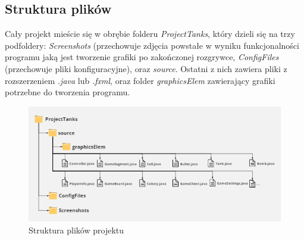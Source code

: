 \documentclass[11pt,a4paper]{report}
\begin{document}
\subsection {Struktura plików}
Cały projekt mieście się w obrębie folderu \textsl{ProjectTanks}, który dzieli się na trzy podfoldery: \textsl{Screenshots} (przechowuje zdjęcia powstałe w wyniku funkcjonalności programu jaką jest tworzenie grafiki po zakończonej rozgrywce, \textsl{ConfigFiles} (przechowuje pliki konfiguracyjne), oraz \textsl{source}. Ostatni z nich zawiera pliki z rozszerzeniem \textsl{.java} lub \textsl{.fxml}, oraz folder \textsl{graphicsElem} zawierający grafiki potrzebne do tworzenia programu.
 \begin{figure}[!ht]
\centerline{\includegraphics{img/FileStructure.png}}
\caption{Struktura plików projektu}
\end{figure}
\end{document}
